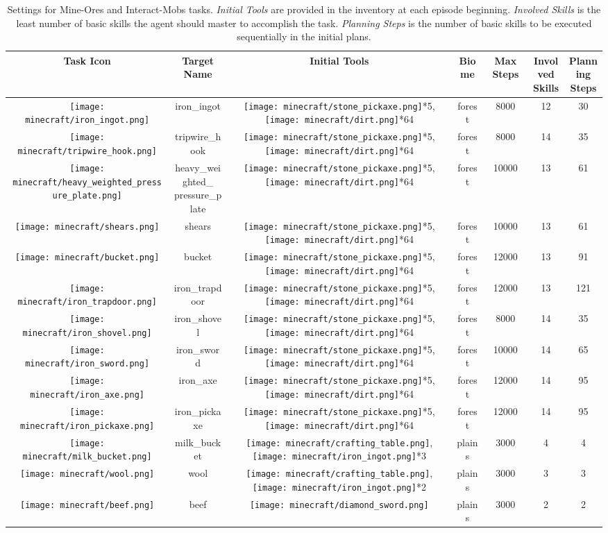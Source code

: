 \documentclass{article}
\newcommand{\mcbeef}{\texttt{[image: minecraft/beef.png]}}
\newcommand{\mcbucket}{\texttt{[image: minecraft/bucket.png]}}
\newcommand{\mccraftingtable}{\texttt{[image: minecraft/crafting\_table.png]}}
\newcommand{\mcdiamondsword}{\texttt{[image: minecraft/diamond\_sword.png]}}
\newcommand{\mcironingot}{\texttt{[image: minecraft/iron\_ingot.png]}}
\newcommand{\mcmilkbucket}{\texttt{[image: minecraft/milk\_bucket.png]}}
\newcommand{\mcshears}{\texttt{[image: minecraft/shears.png]}}
\newcommand{\mcstonepickaxe}{\texttt{[image: minecraft/stone\_pickaxe.png]}}
\newcommand{\mcwool}{\texttt{[image: minecraft/wool.png]}}
\newcommand{\mcheavypressureplate}{\texttt{[image: minecraft/heavy\_weighted\_pressure\_plate.png]}}
\newcommand{\mcironaxe}{\texttt{[image: minecraft/iron\_axe.png]}}
\newcommand{\mcironpickaxe}{\texttt{[image: minecraft/iron\_pickaxe.png]}}
\newcommand{\mcironshovel}{\texttt{[image: minecraft/iron\_shovel.png]}}
\newcommand{\mcironsword}{\texttt{[image: minecraft/iron\_sword.png]}}
\newcommand{\mcirontrapdoor}{\texttt{[image: minecraft/iron\_trapdoor.png]}}
\newcommand{\mctripwirehook}{\texttt{[image: minecraft/tripwire\_hook.png]}}
\newcommand{\mcdirt}{\texttt{[image: minecraft/dirt.png]}}
\begin{document}
\begin{table}[htbp]
  \caption{Settings for Mine-Ores and Interact-Mobs tasks. \textit{Initial Tools} are provided in the inventory at each episode beginning. \textit{Involved Skills} is the least number of basic skills the agent should master to accomplish the task. \textit{Planning Steps} is the number of basic skills to be executed sequentially in the initial plans. }
  \label{tab:task-setup-2}
  \centering
  \begin{tabular}{ccccccc}
    \toprule
    Task Icon  & Target Name & Initial Tools & Biome & Max Steps & \makecell{Involved\\Skills} & \makecell{Planning\\Steps} \\
    \midrule
    \mcironingot  & iron\_ingot & \mcstonepickaxe*5, \mcdirt*64 & forest & 8000 & 12 & 30  \\
    \mctripwirehook  & tripwire\_hook & \mcstonepickaxe*5, \mcdirt*64 & forest & 8000 & 14 & 35  \\
    \mcheavypressureplate  & \makecell{heavy\_weighted\_ \\ pressure\_plate} & \mcstonepickaxe*5, \mcdirt*64 & forest & 10000 & 13 & 61  \\
    \mcshears  & shears & \mcstonepickaxe*5, \mcdirt*64 & forest & 10000 & 13 & 61  \\
    \mcbucket  & bucket & \mcstonepickaxe*5, \mcdirt*64 & forest & 12000 & 13 & 91  \\
    \mcirontrapdoor  & iron\_trapdoor & \mcstonepickaxe*5, \mcdirt*64 & forest & 12000 & 13 & 121  \\
    \mcironshovel  & iron\_shovel & \mcstonepickaxe*5, \mcdirt*64 & forest & 8000 & 14 & 35  \\
    \mcironsword  & iron\_sword & \mcstonepickaxe*5, \mcdirt*64 & forest & 10000 & 14 & 65  \\
    \mcironaxe  & iron\_axe & \mcstonepickaxe*5, \mcdirt*64 & forest & 12000 & 14 & 95  \\
    \mcironpickaxe  & iron\_pickaxe & \mcstonepickaxe*5, \mcdirt*64 & forest & 12000 & 14 & 95  \\
    \midrule
    \mcmilkbucket  & milk\_bucket & \mccraftingtable, \mcironingot*3 & plains & 3000 & 4 & 4 \\
    \mcwool  & wool & \mccraftingtable, \mcironingot*2 & plains & 3000 & 3 & 3 \\
    \mcbeef  & beef  & \mcdiamondsword & plains & 3000 & 2 & 2 \\

\end{tabular}
\end{table}
\end{document}
